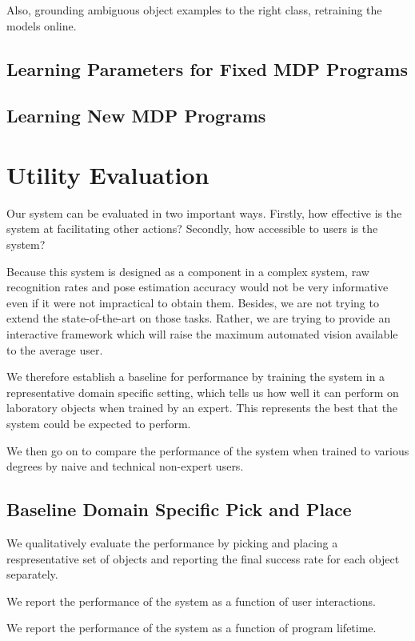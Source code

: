 \documentclass[conference]{IEEEtran}
\begin{document}
Also, grounding ambiguous object examples to the right class, retraining the models online.

\subsection{Learning Parameters for Fixed MDP Programs}


\subsection{Learning New MDP Programs}


\section{Utility Evaluation}
Our system can be evaluated in two important ways. Firstly, how effective is 
the system at facilitating other actions? Secondly, how accessible to users is the system?

Because this system is designed as a component in a complex system, raw recognition rates
and pose estimation accuracy would not be very informative even if it were not impractical to
obtain them.  Besides, we are not trying to extend the state-of-the-art on those tasks. Rather,
we are trying to provide an interactive framework which will raise the maximum automated vision
available to the average user.

We therefore establish a baseline for performance by training the system in a representative domain
specific setting, which tells us how well it can perform on laboratory objects when trained by an 
expert. This represents the best that the system could be expected to perform.

We then go on to compare the performance of the system when trained to various degrees by naive
and technical non-expert users.

\subsection{Baseline Domain Specific Pick and Place}
We qualitatively evaluate the performance by picking and placing
a respresentative set of objects and reporting the final success rate for each 
object separately.

We report the performance of the system as a function of user interactions.

We report the performance of the system as a function of program lifetime.
\end{document}
